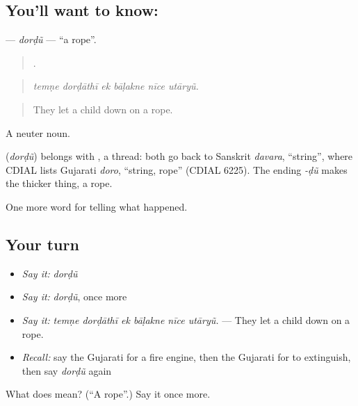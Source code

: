 \subsection*{You'll want to know: }
\textbf{} — \emph{dorḍũ} — \textquotedblleft{}a rope\textquotedblright{}.

\begin{quote}
     .
\end{quote}

\begin{quote}
\emph{temṇe dorḍāthī ek bāḷakne nīce utāryũ.}
\end{quote}

\begin{quote}
They let a child down on a rope.
\end{quote}

A neuter noun.

\begin{cousinweb}
\textbf{} (\emph{dorḍũ}) belongs with \textbf{}, a thread: both go back to Sanskrit \emph{davara}, \textquotedblleft{}string\textquotedblright{}, where CDIAL lists Gujarati \emph{doro}, \textquotedblleft{}string, rope\textquotedblright{} (CDIAL 6225). The ending \emph{-ḍũ} makes the thicker thing, a rope.
\end{cousinweb}

\begin{grammarlens}[title={What you've built}]
One more word for telling what happened.
\end{grammarlens}

\subsection*{Your turn}
\begin{itemize}
\raggedright
  \item \emph{Say it:} \emph{dorḍũ}
  \item \emph{Say it:} \emph{dorḍũ}, once more
  \item \emph{Say it:} \emph{temṇe dorḍāthī ek bāḷakne nīce utāryũ.} — They let a child down on a rope.
  \item \emph{Recall:} say the Gujarati for a fire engine, then the Gujarati for to extinguish, then say \emph{dorḍũ} again
\end{itemize}

\begin{tcolorbox}[breakable,colback=teal!4,colframe=teal!35!black,title={Before you move on}]
What does  mean? (\textquotedblleft{}A rope\textquotedblright{}.) Say it once more.
\end{tcolorbox}
